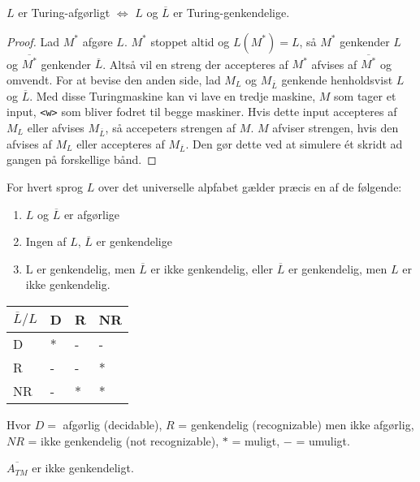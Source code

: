 \begin{theorem}
	$L$ er Turing-afgørligt $\iff$ $L$ og $\overline{L}$ er Turing-genkendelige.
\end{theorem}

\begin{proof}
	Lad $M^{*}$ afgøre $L$. $M^{*}$ stoppet altid og $L(M^{*}) = L$, så $M^{*}$ genkender $L$ og $\overline{M^{*}}$ genkender $\overline{L}$. Altså vil en streng der accepteres af $M^{*}$ afvises af $\overline{M^{*}}$ og omvendt. For at bevise den anden side, lad $M_{L}$ og $M_{\overline{L}}$ genkende henholdsvist $L$ og $\overline{L}$. Med disse Turingmaskine kan vi lave en tredje maskine, $M$ som tager et input, \texttt{<w>} som bliver fodret til begge maskiner. Hvis dette input accepteres af $M_{L}$ eller afvises $M_{\overline{L}}$, så accepeters strengen af $M$. $M$ afviser strengen, hvis den afvises af $M_{L}$ eller accepteres af $M_{\overline{L}}$. Den gør dette ved at simulere ét skridt ad gangen på forskellige bånd.
\end{proof}

\begin{theorem}
	For hvert sprog $L$ over det universelle alpfabet gælder præcis en af de følgende:
	\begin{enumerate}
		\item $L$ og $\overline{L}$ er afgørlige
		\item Ingen af $L$, $\overline{L}$ er genkendelige
		\item L er genkendelig, men $\overline{L}$ er ikke genkendelig, eller $\overline{L}$ er genkendelig, men $L$ er ikke genkendelig.
	\end{enumerate}
	\begin{table}[ht]
		\centering
		\begin{tabular}{|l|l|l|l|}
			\hline
			$\overline{L} / L$ & D & R & NR \\ \hline
			D                  & * & - & -  \\ \hline
			R                  & - & - & *  \\ \hline
			NR                 & - & * & *  \\ \hline
		\end{tabular}
	\end{table}
	Hvor $D = $ afgørlig (decidable), $R$ = genkendelig (recognizable) men ikke afgørlig, $NR$ = ikke genkendelig (not recognizable), $*$ = muligt, $-$ = umuligt.
\end{theorem}

\begin{corollary}
	$\overline{A_{TM}}$ er ikke genkendeligt.
\end{corollary}

